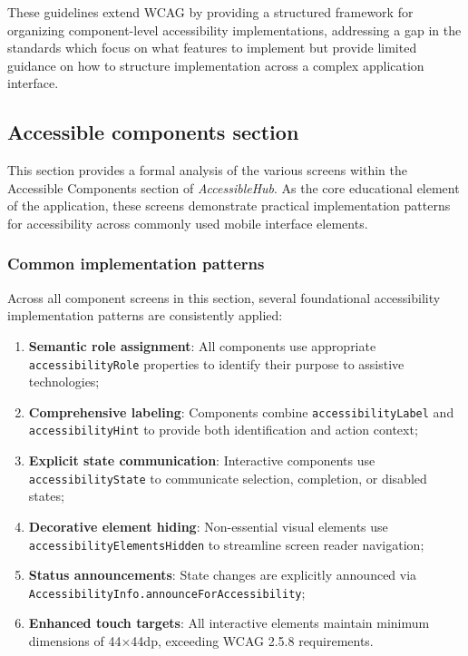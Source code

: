These guidelines extend WCAG by providing a structured framework for organizing component-level accessibility implementations, addressing a gap in the standards which focus on what features to implement but provide limited guidance on how to structure implementation across a complex application interface.

\subsection{Accessible components section}
\label{subsec:accessible-components}

This section provides a formal analysis of the various screens within the Accessible Components section of \textit{AccessibleHub}. As the core educational element of the application, these screens demonstrate practical implementation patterns for accessibility across commonly used mobile interface elements. 

\subsubsection{Common implementation patterns}
\label{subsubsec:common-patterns}

Across all component screens in this section, several foundational accessibility implementation patterns are consistently applied:

\begin{enumerate}
    \item \textbf{Semantic role assignment}: All components use appropriate \texttt{accessibilityRole} properties to identify their purpose to assistive technologies;
    
    \item \textbf{Comprehensive labeling}: Components combine \texttt{accessibilityLabel} and \\\texttt{accessibilityHint} to provide both identification and action context;
    
    \item \textbf{Explicit state communication}: Interactive components use \texttt{accessibilityState} to communicate selection, completion, or disabled states;
    
    \item \textbf{Decorative element hiding}: Non-essential visual elements use \\\texttt{accessibilityElementsHidden} to streamline screen reader navigation;
    
    \item \textbf{Status announcements}: State changes are explicitly announced via \\\texttt{AccessibilityInfo.announceForAccessibility};
    
    \item \textbf{Enhanced touch targets}: All interactive elements maintain minimum dimensions of 44×44dp, exceeding WCAG 2.5.8 requirements.
\end{enumerate}

